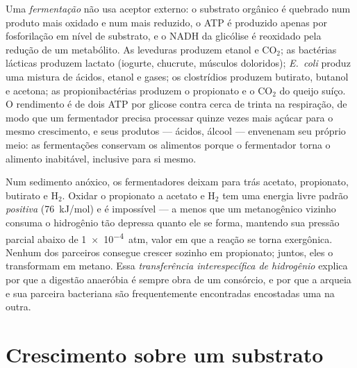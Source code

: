 \begin{definition}\label{def:b2:microbial-metabolism:fermentation}
Uma \emph{fermentação} não usa aceptor externo: o substrato orgânico
é quebrado num produto mais oxidado e num mais reduzido, o ATP é
produzido apenas por fosforilação em nível de substrato, e o NADH da
glicólise é reoxidado pela redução de um metabólito. As leveduras
produzem etanol e $\mathrm{CO_2}$; as bactérias lácticas produzem
lactato (iogurte, chucrute, músculos doloridos); \emph{E.~coli}
produz uma mistura de ácidos, etanol e gases; os clostrídios produzem
butirato, butanol e acetona; as propionibactérias produzem o
propionato e o $\mathrm{CO_2}$ do queijo suíço. O rendimento é de dois
ATP por glicose contra cerca de trinta na respiração, de modo que um
fermentador precisa processar quinze vezes mais açúcar para o mesmo
crescimento, e seus produtos --- ácidos, álcool --- envenenam seu
próprio meio: as fermentações conservam os alimentos porque o
fermentador torna o alimento inabitável, inclusive para si mesmo.
\end{definition}

\begin{example}\label{ex:b2:microbial-metabolism:syntrophy}
Num sedimento anóxico, os fermentadores deixam para trás acetato,
propionato, butirato e $\mathrm{H_2}$. Oxidar o propionato a acetato e
$\mathrm{H_2}$ tem uma energia livre padrão \emph{positiva}
(\qty{+76}{kJ/mol}) e é impossível --- a menos que um metanogênico
vizinho consuma o hidrogênio tão depressa quanto ele se forma,
mantendo sua pressão parcial abaixo de \qty{1e-4}{atm}, valor em que a
reação se torna exergônica. Nenhum dos parceiros consegue crescer
sozinho em propionato; juntos, eles o transformam em metano. Essa
\emph{transferência interespecífica de hidrogênio} explica por que a
digestão anaeróbia é sempre obra de um consórcio, e por que a arqueia
e sua parceira bacteriana são frequentemente encontradas encostadas
uma na outra.
\end{example}

\section{Crescimento sobre um substrato}

